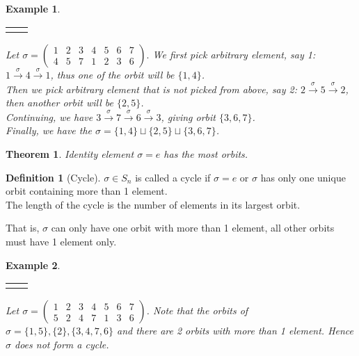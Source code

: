 \documentclass{article}
\theoremstyle{MyNonumberplain}
\theoremstyle{break}
\newcommand{\nline}{\begin{tabular}{ll}&\\\end{tabular}}
\theoremstyle{break}
\newtheorem{theorem}{Theorem}[section]
\newtheorem{example}{Example}[section]
\theoremstyle{break}
\theoremstyle{definition}
\theoremstyle{break}
\newtheorem{definition}{Definition}[section]
\begin{document}
\begin{expbox}
    \begin{example}

        \nline

        Let $\sigma = \left(\begin{array}{ccccccc}
            1 & 2 & 3 & 4 & 5 & 6 & 7\\
            4 & 5 & 7 & 1 & 2 & 3 & 6
          \end{array}\right) .$ We first pick arbitrary element, say 1: $1 \xrightarrow{\sigma} 4
          \xrightarrow{\sigma} 1$, thus one of the orbit will be $\{ 1, 4 \}$.\\
          
          Then we pick arbitrary element that is not picked from above, say 2: $2
          \xrightarrow{\sigma} 5 \xrightarrow{\sigma} 2$, then another orbit will be
          $\{2, 5\}$.\\
          
          Continuing, we have $3 \xrightarrow{\sigma} 7 \xrightarrow{\sigma} 6
          \xrightarrow{\sigma} 3$, giving orbit $\{ 3, 6, 7 \}$.\\
          
          Finally, we have the $\sigma = \{ 1, 4 \} \sqcup \{ 2, 5 \} \sqcup \{ 3, 6, 7
          \}$.
    \end{example}
\end{expbox}

\begin{thmbox}
    \begin{theorem}
        Identity element $\sigma=e$ has the most orbits. 
    \end{theorem}
\end{thmbox}

\begin{defbox}
    \begin{definition}[Cycle]
        $\sigma \in S_n$ is called a cycle if $\sigma = e$ or $\sigma$ has only one unique orbit containing more than 1 element. \\

        The length of the cycle is the number of elements in its largest orbit.
    \end{definition}
\end{defbox}
That is, $\sigma$ can only have one orbit with more than 1 element, all other orbits must have 1 element only.

\begin{expbox}
    \begin{example}

        \nline

        Let $\sigma = \left(\begin{array}{ccccccc}
            1 & 2 & 3 & 4 & 5 & 6 & 7\\
            5 & 2 & 4 & 7 & 1 & 3 & 6
          \end{array}\right)$. Note that the orbits of $\sigma = \{ 1, 5 \}, \{ 2 \}, \{
          3, 4, 7, 6 \}$ and there are 2 orbits with more than 1 element. Hence $\sigma$
          does not form a cycle.
    \end{example}
\end{expbox}
\end{document}
